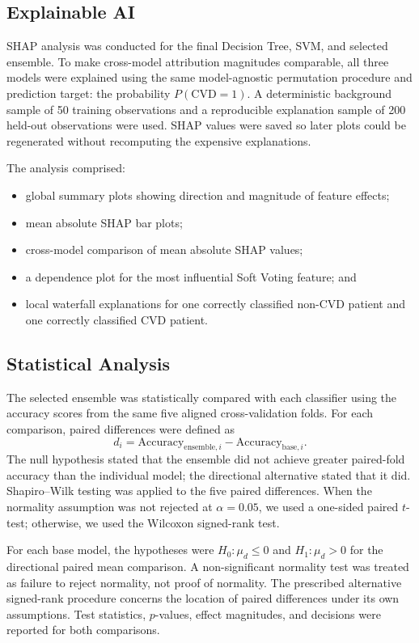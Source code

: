 \documentclass[11pt,a4paper]{article}
\begin{document}
\subsection{Explainable AI}

SHAP analysis \cite{lundberg2017} was conducted for the final Decision Tree, SVM, and selected ensemble. To make cross-model attribution magnitudes comparable, all three models were explained using the same model-agnostic permutation procedure and prediction target: the probability $P(\mathrm{CVD}=1)$. A deterministic background sample of 50 training observations and a reproducible explanation sample of 200 held-out observations were used. SHAP values were saved so later plots could be regenerated without recomputing the expensive explanations.

The analysis comprised:
\begin{itemize}
    \item global summary plots showing direction and magnitude of feature effects;
    \item mean absolute SHAP bar plots;
    \item cross-model comparison of mean absolute SHAP values;
    \item a dependence plot for the most influential Soft Voting feature; and
    \item local waterfall explanations for one correctly classified non-CVD patient and one correctly classified CVD patient.
\end{itemize}

\subsection{Statistical Analysis}

The selected ensemble was statistically compared with each classifier using the accuracy scores from the same five aligned cross-validation folds. For each comparison, paired differences were defined as
\[
d_i = \mathrm{Accuracy}_{\mathrm{ensemble},i} -
      \mathrm{Accuracy}_{\mathrm{base},i}.
\]
The null hypothesis stated that the ensemble did not achieve greater paired-fold accuracy than the individual model; the directional alternative stated that it did. Shapiro--Wilk testing was applied to the five paired differences. When the normality assumption was not rejected at $\alpha=0.05$, we used a one-sided paired $t$-test; otherwise, we used the Wilcoxon signed-rank test.

For each base model, the hypotheses were $H_0:\mu_d\leq0$ and $H_1:\mu_d>0$ for the directional paired mean comparison. A non-significant normality test was treated as failure to reject normality, not proof of normality. The prescribed alternative signed-rank procedure concerns the location of paired differences under its own assumptions. Test statistics, $p$-values, effect magnitudes, and decisions were reported for both comparisons.
\end{document}
